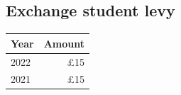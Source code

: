 \documentclass[12pt]{article}
\begin{document}
\subsection{Exchange student levy}
\begin{center}
\begin{tabular}{|l|r|}\hline
    \textbf{Year} & \textbf{Amount} \\\hline
    2022 & £15 \\
    2021 & £15 \\
    \hline
\end{tabular}
\end{center}
\end{document}
